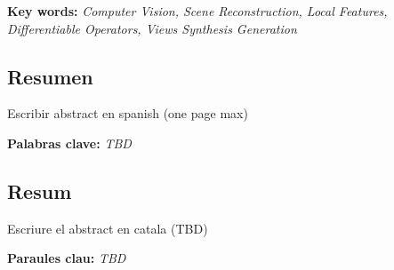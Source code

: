 \vspace{1mm}
\textbf{Key words:} \textit{Computer Vision, Scene Reconstruction, Local Features, Differentiable Operators, Views Synthesis Generation}


\begin{otherlanguage}{spanish}
\chapter*{Resumen}

\vspace{-24mm}

Escribir abstract en spanish (one page max)

\vspace{1mm}
\textbf{Palabras clave:} \textit{TBD}



\end{otherlanguage}



\begin{otherlanguage}{catalan}
\cleardoublepage
\chapter*{Resum}
\vspace{-24mm}

Escriure el abstract en catala (TBD)

\vspace{1mm}
\textbf{Paraules clau:} \textit{TBD}


\end{otherlanguage}


